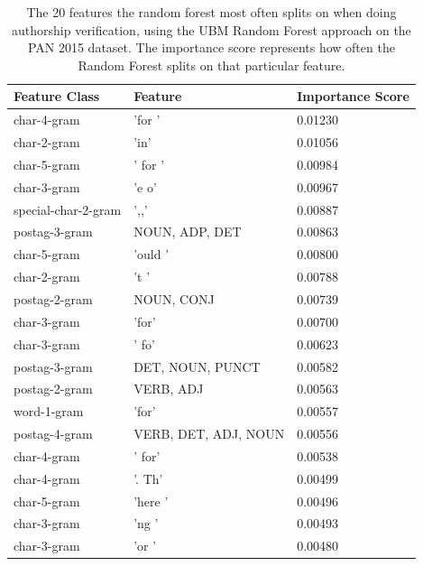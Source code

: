 \begin{table}
    \centering
    \begin{tabular}{lll}
        \textbf{Feature Class} & \textbf{Feature}     & \textbf{Importance Score} \\
        \hline
        char-4-gram            & 'for '               & 0.01230                   \\
        char-2-gram            & 'in'                 & 0.01056                   \\
        char-5-gram            & ' for '              & 0.00984                   \\
        char-3-gram            & 'e o'                & 0.00967                   \\
        special-char-2-gram    & ',,'                 & 0.00887                   \\
        postag-3-gram          & NOUN, ADP, DET       & 0.00863                   \\
        char-5-gram            & 'ould '              & 0.00800                   \\
        char-2-gram            & 't '                 & 0.00788                   \\
        postag-2-gram          & NOUN, CONJ           & 0.00739                   \\
        char-3-gram            & 'for'                & 0.00700                   \\
        char-3-gram            & ' fo'                & 0.00623                   \\
        postag-3-gram          & DET, NOUN, PUNCT     & 0.00582                   \\
        postag-2-gram          & VERB, ADJ            & 0.00563                   \\
        word-1-gram            & 'for'                & 0.00557                   \\
        postag-4-gram          & VERB, DET, ADJ, NOUN & 0.00556                   \\
        char-4-gram            & ' for'               & 0.00538                   \\
        char-4-gram            & '. Th'               & 0.00499                   \\
        char-5-gram            & 'here '              & 0.00496                   \\
        char-3-gram            & 'ng '                & 0.00493                   \\
        char-3-gram            & 'or '                & 0.00480
    \end{tabular}
    \caption{The 20 features the random forest most often splits on when doing
    authorship verification, using the \gls{UBM} Random Forest approach on the
    PAN 2015 dataset. The importance score represents how often the Random
    Forest splits on that particular feature.}
    \label{tab:feature_importance}
\end{table}

